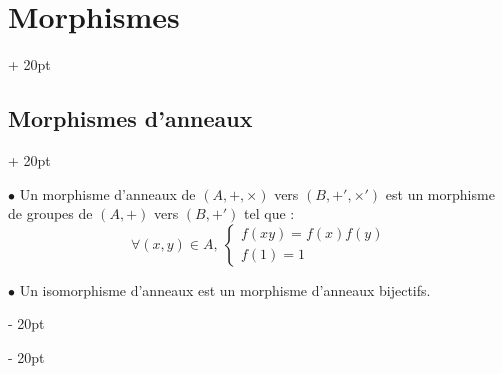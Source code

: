 \documentclass[a4paper, 12pt, twoside]{article}
\newcommand{\eqsys}[2]{\begin{cases} #1 \\ #2 \end{cases}}
\newcommand{\ind}[1][20pt]{\advance\leftskip + #1}
\newcommand{\deind}[1][20pt]{\advance\leftskip - #1}
\newenvironment{indentedenv}[1][20pt]{\par \ind[#1]}{\par \deind}
\newenvironment{indt}[2][20pt]{#2 \begin{indentedenv}[#1]}{\end{indentedenv}} %
\begin{document}
\begin{indt}{\section{Morphismes}}
\begin{indt}{\subsection{Morphismes d'anneaux}}
            \vspace{6pt}
            
            $\bullet$ Un morphisme d'anneaux de $(A, +, \times)$ vers $(B, +', \times')$ est un morphisme de groupes de $(A, +)$ vers $(B, +')$ tel que :
                \[ \forall (x, y) \in A,\ \eqsys{f(xy) = f(x)f(y)}{f(1) = 1} \]
            
            $\bullet$ Un isomorphisme d'anneaux est un morphisme d'anneaux bijectifs.
        \end{indt}
    \end{indt}
    
    
\end{document}
